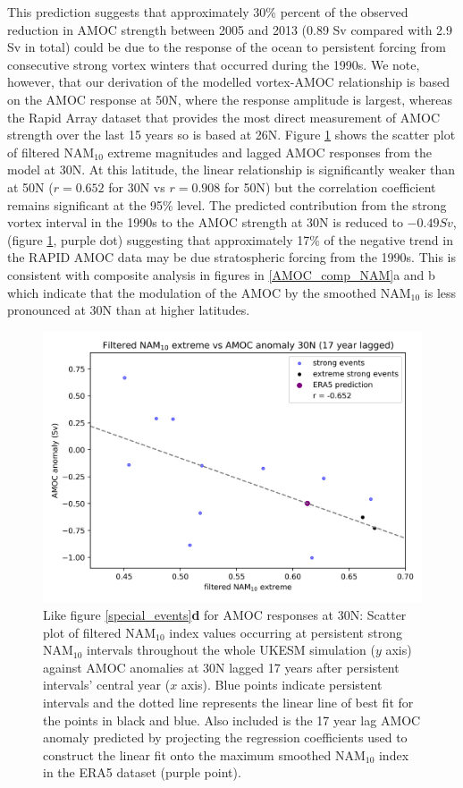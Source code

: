 This prediction suggests that approximately 30\% percent of the observed reduction in AMOC strength  between 2005 and 2013 (0.89 Sv compared with 2.9 Sv in total) could be due to the response of the ocean to persistent forcing from consecutive strong vortex winters that occurred during the 1990s. We note, however, that our derivation of the modelled vortex-AMOC relationship is based on the AMOC response at 50N, where the response amplitude is largest, whereas the Rapid Array dataset that provides the most direct measurement of AMOC strength over the last 15 years so is based at 26N.  Figure \ref{special_events_30} shows the scatter plot of filtered NAM$_{10}$ extreme magnitudes and lagged AMOC responses from the model at 30N. At this latitude, the linear relationship is significantly weaker than at 50N ($r = 0.652$ for 30N vs $r = 0.908$ for 50N) but the correlation coefficient remains significant at the 95\% level. The predicted contribution from the strong vortex interval in the 1990s to the AMOC strength at 30N is reduced to $-0.49Sv$,  (figure \ref{special_events_30}, purple dot) suggesting that  approximately 17\% of the negative trend in the RAPID AMOC data may be due stratospheric forcing from the 1990s. This is consistent with composite analysis in figures in \ref{AMOC_comp_NAM}a and b which indicate that the modulation of the AMOC by the smoothed NAM$_{10}$ is less pronounced at 30N than at higher latitudes.

\begin{figure}[h!]
\begin{center}
\noindent\includegraphics[width = 0.6\linewidth]{Figures/Figures-surface/AMOC_response_special_events_30N_AMOC.png} 
\caption[Regression of NAM$_{10}$ extreme magnitude vs AMOC anomaly at 30N]{Like figure \ref{special_events}\textbf{d} for AMOC responses at 30N: Scatter plot of filtered NAM$_{10}$ index values occurring at persistent strong NAM$_{10}$ intervals throughout the whole UKESM simulation ($y$ axis) against AMOC anomalies at 30N lagged 17 years after persistent intervals' central year ($x$ axis). Blue points indicate persistent intervals and the dotted line represents the linear line of best fit for the points in black and blue. Also included is the 17 year lag AMOC anomaly predicted by projecting the regression coefficients used to construct the linear fit onto the maximum smoothed NAM$_{10}$ index in the ERA5 dataset (purple point).}
\label{special_events_30}
\end{center}
\end{figure}


